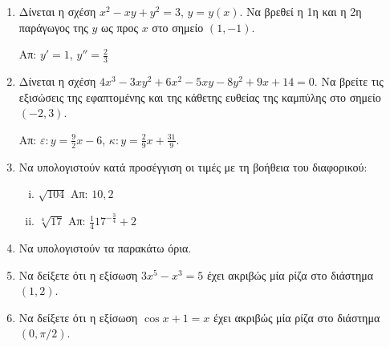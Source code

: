 \begin{enumerate}
  \item Δίνεται η σχέση $ x^{2} - xy + y^{2} = 3 $, $ y=y(x) $. Να βρεθεί η 1η
    και η 2η παράγωγος της $y$ ως προς $x$ στο σημείο $ (1,-1) $.

    \hfill Απ: $ y' = 1$, $ y'' = \frac{2}{3} $

  \item Δίνεται η σχέση $ 4x^{3} - 3xy^{2} + 6x^{2} - 5xy - 8 y^{2} + 9x + 14
    = 0$. Να βρείτε τις εξισώσεις της εφαπτομένης και της κάθετης ευθείας
    της καμπύλης στο σημείο $ (-2,3) $.

    \hfill Απ: $\varepsilon\colon y = \frac{9}{2} x - 6 $, 
    $\kappa\colon y = \frac{2}{9} x + \frac{31}{9} $.

  \item Να υπολογιστούν κατά προσέγγιση οι τιμές με τη βοήθεια του διαφορικού:
    \begin{enumerate}[i)]
      \item $\sqrt{104}$ \hfill Απ: $10,2$
      \item $\sqrt[4]{17}$ \hfill Απ: $\frac{1}{4}17^{-\frac{3}{4}}+2$
    \end{enumerate}

  \item Να υπολογιστούν τα παρακάτω όρια.
    \begin{enumerate}[(i)]
    \end{enumerate}

    \item Να δείξετε ότι η εξίσωση $ 3x^{5}-x^{3}=5 $ έχει ακριβώς μία ρίζα στο διάστημα 
      $ (1,2) $.
    \item Να δείξετε ότι η εξίσωση $ \cos{x} + 1 = x $ έχει ακριβώς μία ρίζα στο 
      διάστημα $ (0, \pi/2) $. 


\end{enumerate}
